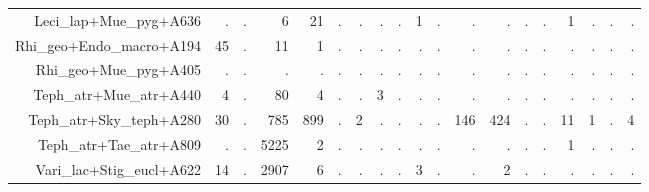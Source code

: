 \documentclass[a4paper, 11]{article}\usepackage[]{graphicx}\usepackage[]{color}
\begin{document}
\begin{table}
\begin{tabular}{rrrrrrrrrrrrrrrrrrr}
  Leci\_lap+Mue\_pyg+A636 & . & . & 6 & 21 & . & . & . & . & 1 & . & . & . & . & . & 1 & . & . & . \\ 
  Rhi\_geo+Endo\_macro+A194 & 45 & . & 11 & 1 & . & . & . & . & . & . & . & . & . & . & . & . & . & . \\ 
  Rhi\_geo+Mue\_pyg+A405 & . & . & . & . & . & . & . & . & . & . & . & . & . & . & . & . & . & . \\ 
  Teph\_atr+Mue\_atr+A440 & 4 & . & 80 & 4 & . & . & 3 & . & . & . & . & . & . & . & . & . & . & . \\ 
  Teph\_atr+Sky\_teph+A280 & 30 & . & 785 & 899 & . & 2 & . & . & . & . & 146 & 424 & . & . & 11 & 1 & . & 4 \\ 
  Teph\_atr+Tae\_atr+A809 & . & . & 5225 & 2 & . & . & . & . & . & . & . & . & . & . & 1 & . & . & . \\ 
  Vari\_lac+Stig\_eucl+A622 & 14 & . & 2907 & 6 & . & . & . & . & 3 & . & . & 2 & . & . & . & . & . & . \\ 
   \hline
\end{tabular}
\end{table}
\end{document}
